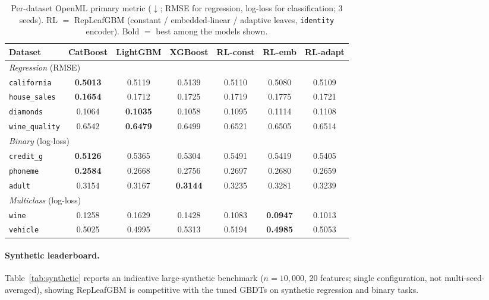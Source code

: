 \documentclass[11pt]{article}
\begin{document}
\begin{table}[h]
\centering
\small
\caption{Per-dataset OpenML primary metric ($\downarrow$; RMSE for regression, log-loss for
classification; 3 seeds). RL $=$ RepLeafGBM (constant / embedded-linear / adaptive leaves,
\texttt{identity} encoder). Bold $=$ best among the models shown.}
\label{tab:openml-full}
\begin{tabular}{lcccccc}
\toprule
Dataset & CatBoost & LightGBM & XGBoost & RL-const & RL-emb & RL-adapt \\
\midrule
\multicolumn{7}{l}{\emph{Regression} (RMSE)}\\
\texttt{california}    & \textbf{0.5013} & 0.5119 & 0.5139 & 0.5110 & 0.5080 & 0.5109 \\
\texttt{house\_sales}  & \textbf{0.1654} & 0.1712 & 0.1725 & 0.1719 & 0.1775 & 0.1721 \\
\texttt{diamonds}      & 0.1064 & \textbf{0.1035} & 0.1058 & 0.1095 & 0.1114 & 0.1108 \\
\texttt{wine\_quality} & 0.6542 & \textbf{0.6479} & 0.6499 & 0.6521 & 0.6505 & 0.6514 \\
\midrule
\multicolumn{7}{l}{\emph{Binary} (log-loss)}\\
\texttt{credit\_g}     & \textbf{0.5126} & 0.5365 & 0.5304 & 0.5491 & 0.5419 & 0.5405 \\
\texttt{phoneme}       & \textbf{0.2584} & 0.2668 & 0.2756 & 0.2697 & 0.2680 & 0.2659 \\
\texttt{adult}         & 0.3154 & 0.3167 & \textbf{0.3144} & 0.3235 & 0.3281 & 0.3239 \\
\midrule
\multicolumn{7}{l}{\emph{Multiclass} (log-loss)}\\
\texttt{wine}          & 0.1258 & 0.1629 & 0.1428 & 0.1083 & \textbf{0.0947} & 0.1013 \\
\texttt{vehicle}       & 0.5025 & 0.4995 & 0.5313 & 0.5194 & \textbf{0.4985} & 0.5053 \\
\bottomrule
\end{tabular}
\end{table}

\paragraph{Synthetic leaderboard.}
Table~\ref{tab:synthetic} reports an indicative large-synthetic benchmark
($n{=}10{,}000$, 20 features; single configuration, not multi-seed-averaged), showing
RepLeafGBM is competitive with the tuned GBDTs on synthetic regression and binary tasks.
\end{document}
